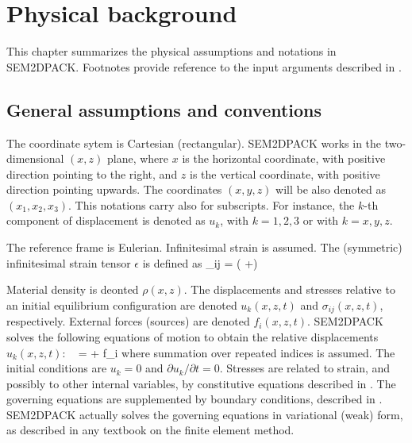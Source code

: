 \chapter{Physical background}
\label{Cha:phys}

This chapter summarizes the physical assumptions and notations in SEM2DPACK.
Footnotes provide reference to the input arguments described in .

\section{General assumptions and conventions}

The coordinate sytem is Cartesian (rectangular). 
SEM2DPACK works in the two-dimensional $(x,z)$ plane,
where $x$ is the horizontal coordinate, with positive direction pointing to the right, 
and $z$ is the vertical coordinate, with positive direction pointing upwards.
The coordinates $(x,y,z)$ will be also denoted as $(x_1,x_2,x_3)$.
This notations carry also for subscripts. For instance,
the $k$-th component of displacement is denoted as $u_k$, with $k=1,2,3$ or with $k=x,y,z$.

The reference frame is Eulerian.
Infinitesimal strain is assumed.
The (symmetric) infinitesimal strain tensor $\epsilon$ is defined as 
\eq
 \epsilon_{ij} =  \left( +\right)
\en

Material density is deonted $\rho(x,z)$.
The displacements and stresses relative to an initial equilibrium configuration
are denoted $u_k(x,z,t)$ and $\sigma_{ij}(x,z,t)$, respectively.
External forces (sources) are denoted $f_i(x,z,t)$. 
SEM2DPACK solves the following equations of motion to obtain
the relative displacements $u_k(x,z,t)$:
\eq
  \rho\  =  + f_i
\en
where summation over repeated indices is assumed.
The initial conditions are $u_k=0$ and $\partial u_k/\partial t = 0$.
Stresses are related to strain, and possibly to other internal variables,
by constitutive equations described in .
The governing equations are supplemented by boundary conditions, described in . 
SEM2DPACK actually solves the governing equations in variational (weak) form,
as described in any textbook on the finite element method.

